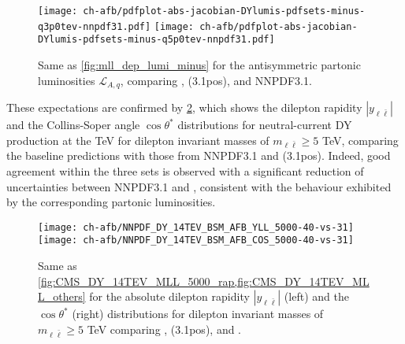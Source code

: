 \begin{figure}[!t]
 \centering
 \texttt{[image: ch-afb/pdfplot-abs-jacobian-DYlumis-pdfsets-minus-q3p0tev-nnpdf31.pdf]}
 \texttt{[image: ch-afb/pdfplot-abs-jacobian-DYlumis-pdfsets-minus-q5p0tev-nnpdf31.pdf]}
 \caption{Same as \cref{fig:mll_dep_lumi_minus} for the antisymmetric partonic luminosities $\mathcal{L}_{A,q}$,
   comparing , (3.1pos), and NNPDF3.1.
 }    
 \label{fig:pdfplot-absDYlumis-pdfsets-minus-q5tev-nnpdf31}
\end{figure}

These expectations are confirmed by
\cref{fig:CMS_DY_14TEV_COSTH_5000_YLL40-vs-31}, which shows the
dilepton rapidity $|y_{\ell\bar{\ell}}|$ 
and the Collins-Soper angle $\cos\theta^*$ distributions for neutral-current DY production
at the  TeV for dilepton invariant masses of $m_{\ell\bar{\ell}}\ge 5$ TeV,
comparing the baseline  predictions with those from NNPDF3.1
and (3.1pos).
%
Indeed, 
good agreement within the three \pdf sets is observed with a significant reduction
of \pdf uncertainties between NNPDF3.1 and , consistent
with the behaviour exhibited by the corresponding partonic luminosities.

\begin{figure}[!t]
 \centering
 \texttt{[image: ch-afb/NNPDF\_DY\_14TEV\_BSM\_AFB\_YLL\_5000-40-vs-31]}
 \texttt{[image: ch-afb/NNPDF\_DY\_14TEV\_BSM\_AFB\_COS\_5000-40-vs-31]}
 \caption{
   Same as \cref{fig:CMS_DY_14TEV_MLL_5000_rap,fig:CMS_DY_14TEV_MLL_others} for
   the absolute dilepton rapidity $|y_{\ell\bar{\ell}}|$ (left) and the $\cos
   \theta^*$ (right) distributions for dilepton invariant masses of
   $m_{\ell\bar{\ell}}\ge 5$ TeV comparing , (3.1pos),
   and .
 }    
 \label{fig:CMS_DY_14TEV_COSTH_5000_YLL40-vs-31}
\end{figure}

